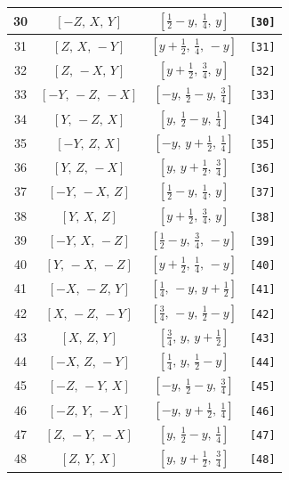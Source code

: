 \documentclass[fleqn,8pt]{jsarticle}
\begin{document}
\begin{longtable}{cccc}
30 & $\left[ - Z,\, X,\, Y \right]$ & $\left[ \frac{1}{2} - y,\, \frac{1}{4},\, y \right]$ & {\tt [30]} \\ \hline
31 & $\left[ Z,\, X,\, - Y \right]$ & $\left[ y + \frac{1}{2},\, \frac{1}{4},\, - y \right]$ & {\tt [31]} \\ \hline
32 & $\left[ Z,\, - X,\, Y \right]$ & $\left[ y + \frac{1}{2},\, \frac{3}{4},\, y \right]$ & {\tt [32]} \\ \hline
33 & $\left[ - Y,\, - Z,\, - X \right]$ & $\left[ - y,\, \frac{1}{2} - y,\, \frac{3}{4} \right]$ & {\tt [33]} \\ \hline
34 & $\left[ Y,\, - Z,\, X \right]$ & $\left[ y,\, \frac{1}{2} - y,\, \frac{1}{4} \right]$ & {\tt [34]} \\ \hline
35 & $\left[ - Y,\, Z,\, X \right]$ & $\left[ - y,\, y + \frac{1}{2},\, \frac{1}{4} \right]$ & {\tt [35]} \\ \hline
36 & $\left[ Y,\, Z,\, - X \right]$ & $\left[ y,\, y + \frac{1}{2},\, \frac{3}{4} \right]$ & {\tt [36]} \\ \hline
37 & $\left[ - Y,\, - X,\, Z \right]$ & $\left[ \frac{1}{2} - y,\, \frac{1}{4},\, y \right]$ & {\tt [37]} \\ \hline
38 & $\left[ Y,\, X,\, Z \right]$ & $\left[ y + \frac{1}{2},\, \frac{3}{4},\, y \right]$ & {\tt [38]} \\ \hline
39 & $\left[ - Y,\, X,\, - Z \right]$ & $\left[ \frac{1}{2} - y,\, \frac{3}{4},\, - y \right]$ & {\tt [39]} \\ \hline
40 & $\left[ Y,\, - X,\, - Z \right]$ & $\left[ y + \frac{1}{2},\, \frac{1}{4},\, - y \right]$ & {\tt [40]} \\ \hline
41 & $\left[ - X,\, - Z,\, Y \right]$ & $\left[ \frac{1}{4},\, - y,\, y + \frac{1}{2} \right]$ & {\tt [41]} \\ \hline
42 & $\left[ X,\, - Z,\, - Y \right]$ & $\left[ \frac{3}{4},\, - y,\, \frac{1}{2} - y \right]$ & {\tt [42]} \\ \hline
43 & $\left[ X,\, Z,\, Y \right]$ & $\left[ \frac{3}{4},\, y,\, y + \frac{1}{2} \right]$ & {\tt [43]} \\ \hline
44 & $\left[ - X,\, Z,\, - Y \right]$ & $\left[ \frac{1}{4},\, y,\, \frac{1}{2} - y \right]$ & {\tt [44]} \\ \hline
45 & $\left[ - Z,\, - Y,\, X \right]$ & $\left[ - y,\, \frac{1}{2} - y,\, \frac{3}{4} \right]$ & {\tt [45]} \\ \hline
46 & $\left[ - Z,\, Y,\, - X \right]$ & $\left[ - y,\, y + \frac{1}{2},\, \frac{1}{4} \right]$ & {\tt [46]} \\ \hline
47 & $\left[ Z,\, - Y,\, - X \right]$ & $\left[ y,\, \frac{1}{2} - y,\, \frac{1}{4} \right]$ & {\tt [47]} \\ \hline
48 & $\left[ Z,\, Y,\, X \right]$ & $\left[ y,\, y + \frac{1}{2},\, \frac{3}{4} \right]$ & {\tt [48]} \\
\end{longtable}
\end{document}
